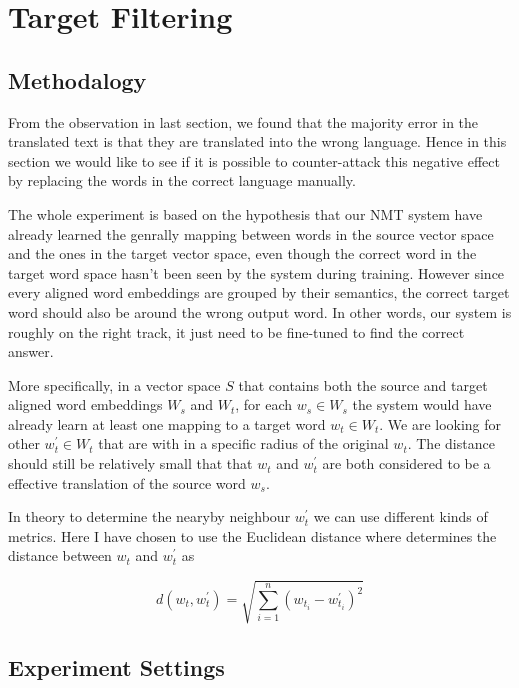 \documentclass[thesis,fonts=libertine]{cluu}
\begin{document}
\chapter{Target Filtering}
\label{chap:target_filtering}

\section{Methodalogy}

From the observation in last section, we found that the majority error in the translated text is that they are translated into the wrong language. Hence in this section we would like to see if it is possible to counter-attack this negative effect by replacing the words in the correct language manually.

The whole experiment is based on the hypothesis that our NMT system have already learned the genrally mapping between words in the source vector space and the ones in the target vector space, even though the correct word in the target word space hasn't been seen by the system during training. However since every aligned word embeddings are grouped by their semantics, the correct target word should also be around the wrong output word. In other words, our system is roughly on the right track, it just need to be fine-tuned to find the correct answer.

More specifically, in a vector space $S$ that contains both the source and target aligned word embeddings $W_s$ and $W_t$, for each $w_s\in W_s$ the system would have already learn at least one mapping to a target word $w_t \in W_t$. We are looking for other $w_t^\prime \in W_t$ that are with in a specific radius of the original $w_t$. The distance should still be relatively small that that $w_t$ and $w_t^\prime$ are both considered to be a effective translation of the source word $w_s$.

In theory to determine the nearyby neighbour $w_t^\prime$ we can use different kinds of metrics. Here I have chosen to use the Euclidean distance where determines the distance between $w_t$ and $w_t^\prime$ as

\begin{equation}
  d(w_t, w_t^\prime)=\sqrt{\sum_{i=1}^n{(w_{t_i}-w^\prime_{t_i})}^2}
\end{equation}

\section{Experiment Settings}
\end{document}
